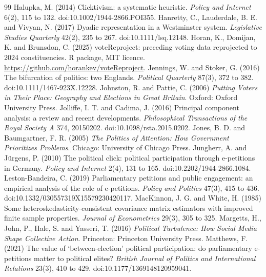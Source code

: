 \documentclass[11pt,a4paper]{article}
\begin{document}
\begin{thebibliography}{99}
 Halupka, M. (2014) Clicktivism: a systematic heuristic. \textit{Policy and Internet} 6(2), 115 to 132. doi:10.1002/1944-2866.POI355.
 Hanretty, C., Lauderdale, B. E. and Vivyan, N. (2017) Dyadic representation in a Westminster system. \textit{Legislative Studies Quarterly} 42(2), 235 to 267. doi:10.1111/lsq.12148.
 Horan, K., Domijan, K. and Brunsdon, C. (2025) voteReproject: preceding voting data reprojected to 2024 constituencies. R package, MIT licence. \url{https://github.com/horankev/voteReproject}.
 Jennings, W. and Stoker, G. (2016) The bifurcation of politics: two Englands. \textit{Political Quarterly} 87(3), 372 to 382. doi:10.1111/1467-923X.12228.
 Johnston, R. and Pattie, C. (2006) \textit{Putting Voters in Their Place: Geography and Elections in Great Britain}. Oxford: Oxford University Press.
 Jolliffe, I. T. and Cadima, J. (2016) Principal component analysis: a review and recent developments. \textit{Philosophical Transactions of the Royal Society A} 374, 20150202. doi:10.1098/rsta.2015.0202.
 Jones, B. D. and Baumgartner, F. R. (2005) \textit{The Politics of Attention: How Government Prioritizes Problems}. Chicago: University of Chicago Press.
 Jungherr, A. and J\"urgens, P. (2010) The political click: political participation through e-petitions in Germany. \textit{Policy and Internet} 2(4), 131 to 165. doi:10.2202/1944-2866.1084.
 Leston-Bandeira, C. (2019) Parliamentary petitions and public engagement: an empirical analysis of the role of e-petitions. \textit{Policy and Politics} 47(3), 415 to 436. doi:10.1332/030557319X15579230420117.
 MacKinnon, J. G. and White, H. (1985) Some heteroskedasticity-consistent covariance matrix estimators with improved finite sample properties. \textit{Journal of Econometrics} 29(3), 305 to 325.
 Margetts, H., John, P., Hale, S. and Yasseri, T. (2016) \textit{Political Turbulence: How Social Media Shape Collective Action}. Princeton: Princeton University Press.
 Matthews, F. (2021) The value of `between-election' political participation: do parliamentary e-petitions matter to political elites? \textit{British Journal of Politics and International Relations} 23(3), 410 to 429. doi:10.1177/1369148120959041.

\end{thebibliography}
\end{document}
